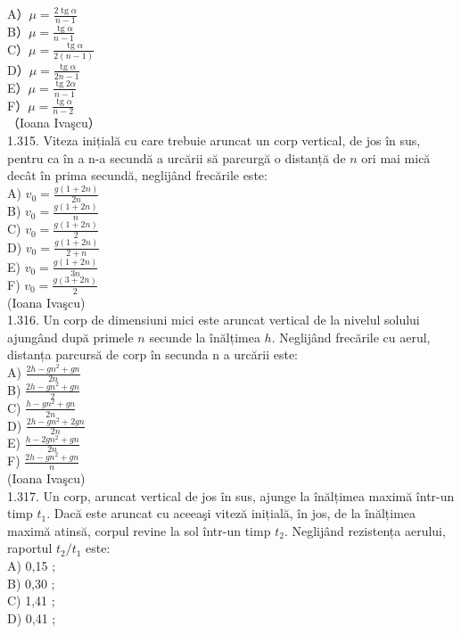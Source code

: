 {A）$\mu=\frac{2 \operatorname{tg} \alpha}{n-1}$\\
B）$\mu=\frac{\operatorname{tg} \alpha}{n-1}$\\
C）$\mu=\frac{\operatorname{tg} \alpha}{2(n-1)}$\\
D）$\mu=\frac{\operatorname{tg} \alpha}{2 n-1}$\\
E）$\mu=\frac{\operatorname{tg} 2 \alpha}{n-1}$\\
F）$\mu=\frac{\operatorname{tg} \alpha}{n-2}$\\
（Ioana Ivaşcu）\\
1.315. Viteza inițială cu care trebuie aruncat un corp vertical, de jos în sus, pentru ca în a n-a secundă a urcării să parcurgă o distanță de $n$ ori mai mică decât în prima secundă, neglijând frecările este:\\
A) $v_{0}=\frac{g(1+2 n)}{2 n}$\\
B) $v_{0}=\frac{g(1+2 n)}{n}$\\
C) $v_{0}=\frac{g(1+2 n)}{2}$\\
D) $v_{0}=\frac{g(1+2 n)}{2+n}$\\
E) $v_{0}=\frac{g(1+2 n)}{3 n}$\\
F) $v_{0}=\frac{g(3+2 n)}{2}$\\
(Ioana Ivaşcu)\\
1.316. Un corp de dimensiuni mici este aruncat vertical de la nivelul solului ajungând după primele $n$ secunde la înălțimea $h$. Neglijând frecările cu aerul, distanța parcursă de corp în secunda n a urcării este:\\
A) $\frac{2 h-g n^{2}+g n}{2 n}$\\
B) $\frac{2 h-g n^{2}+g n}{2}$\\
C) $\frac{h-g n^{2}+g n}{2 n}$\\
D) $\frac{2 h-g n^{2}+2 g n}{2 n}$\\
E) $\frac{h-2 g n^{2}+g n}{2 n}$\\
F) $\frac{2 h-g n^{2}+g n}{n}$\\
(Ioana Ivaşcu)\\
1.317. Un corp, aruncat vertical de jos în sus, ajunge la înălțimea maximă într-un timp $t_{1}$. Dacă este aruncat cu aceeaşi viteză inițială, în jos, de la înălțimea maximă atinsă, corpul revine la sol într-un timp $t_{2}$. Neglijând rezistența aerului, raportul $t_{2} / t_{1}$ este:\\
A) 0,15 ;\\
B) 0,30 ;\\
C) 1,41 ;\\
D) 0,41 ;\\
}
